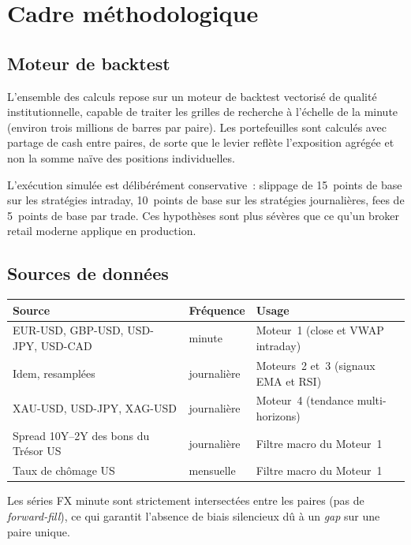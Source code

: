 \section{Cadre méthodologique}
\label{sec:methodology}

\subsection{Moteur de backtest}

L'ensemble des calculs repose sur un moteur de backtest vectorisé de qualité institutionnelle, capable de traiter les grilles de recherche à l'échelle de la minute (environ trois millions de barres par paire). Les portefeuilles sont calculés avec partage de cash entre paires, de sorte que le levier reflète l'exposition agrégée et non la somme naïve des positions individuelles.

L'exécution simulée est délibérément conservative~: slippage de 15~points de base sur les stratégies intraday, 10~points de base sur les stratégies journalières, fees de 5~points de base par trade. Ces hypothèses sont plus sévères que ce qu'un broker retail moderne applique en production.

\subsection{Sources de données}

\begin{center}
\renewcommand{\arraystretch}{1.2}
\begin{tabular}{lll}
\toprule
\textbf{Source} & \textbf{Fréquence} & \textbf{Usage} \\
\midrule
EUR-USD, GBP-USD, USD-JPY, USD-CAD & minute & Moteur~1 (close et VWAP intraday) \\
Idem, resamplées & journalière & Moteurs~2 et~3 (signaux EMA et RSI) \\
XAU-USD, USD-JPY, XAG-USD & journalière & Moteur~4 (tendance multi-horizons) \\
Spread 10Y--2Y des bons du Trésor US & journalière & Filtre macro du Moteur~1 \\
Taux de chômage US & mensuelle & Filtre macro du Moteur~1 \\
\bottomrule
\end{tabular}
\end{center}

Les séries FX minute sont strictement intersectées entre les paires (pas de \emph{forward-fill}), ce qui garantit l'absence de biais silencieux dû à un \emph{gap} sur une paire unique.

